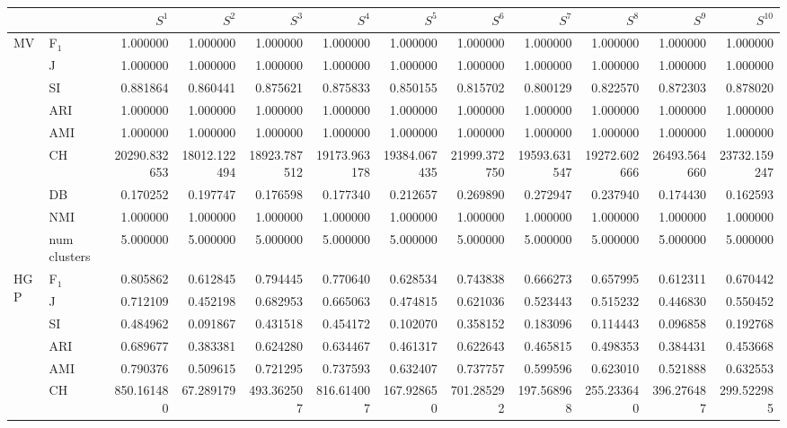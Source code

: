 \begin{tabular}{llrrrrrrrrrr}
\toprule
 &  & $S^{1}$ & $S^{2}$ & $S^{3}$ & $S^{4}$ & $S^{5}$ & $S^{6}$ & $S^{7}$ & $S^{8}$ & $S^{9}$ & $S^{10}$ \\
\midrule
\multirow[c]{9}{*}{MV} & F$_1$ & 1.000000 & 1.000000 & 1.000000 & 1.000000 & 1.000000 & 1.000000 & 1.000000 & 1.000000 & 1.000000 & 1.000000 \\
 & J & 1.000000 & 1.000000 & 1.000000 & 1.000000 & 1.000000 & 1.000000 & 1.000000 & 1.000000 & 1.000000 & 1.000000 \\
 & SI & 0.881864 & 0.860441 & 0.875621 & 0.875833 & 0.850155 & 0.815702 & 0.800129 & 0.822570 & 0.872303 & 0.878020 \\
 & ARI & 1.000000 & 1.000000 & 1.000000 & 1.000000 & 1.000000 & 1.000000 & 1.000000 & 1.000000 & 1.000000 & 1.000000 \\
 & AMI & 1.000000 & 1.000000 & 1.000000 & 1.000000 & 1.000000 & 1.000000 & 1.000000 & 1.000000 & 1.000000 & 1.000000 \\
 & CH & 20290.832653 & 18012.122494 & 18923.787512 & 19173.963178 & 19384.067435 & 21999.372750 & 19593.631547 & 19272.602666 & 26493.564660 & 23732.159247 \\
 & DB & 0.170252 & 0.197747 & 0.176598 & 0.177340 & 0.212657 & 0.269890 & 0.272947 & 0.237940 & 0.174430 & 0.162593 \\
 & NMI & 1.000000 & 1.000000 & 1.000000 & 1.000000 & 1.000000 & 1.000000 & 1.000000 & 1.000000 & 1.000000 & 1.000000 \\
 & num clusters & 5.000000 & 5.000000 & 5.000000 & 5.000000 & 5.000000 & 5.000000 & 5.000000 & 5.000000 & 5.000000 & 5.000000 \\
\multirow[c]{9}{*}{HGP} & F$_1$ & 0.805862 & 0.612845 & 0.794445 & 0.770640 & 0.628534 & 0.743838 & 0.666273 & 0.657995 & 0.612311 & 0.670442 \\
 & J & 0.712109 & 0.452198 & 0.682953 & 0.665063 & 0.474815 & 0.621036 & 0.523443 & 0.515232 & 0.446830 & 0.550452 \\
 & SI & 0.484962 & 0.091867 & 0.431518 & 0.454172 & 0.102070 & 0.358152 & 0.183096 & 0.114443 & 0.096858 & 0.192768 \\
 & ARI & 0.689677 & 0.383381 & 0.624280 & 0.634467 & 0.461317 & 0.622643 & 0.465815 & 0.498353 & 0.384431 & 0.453668 \\
 & AMI & 0.790376 & 0.509615 & 0.721295 & 0.737593 & 0.632407 & 0.737757 & 0.599596 & 0.623010 & 0.521888 & 0.632553 \\
 & CH & 850.161480 & 67.289179 & 493.362507 & 816.614007 & 167.928650 & 701.285292 & 197.568968 & 255.233640 & 396.276487 & 299.522985 \\

\end{tabular}
